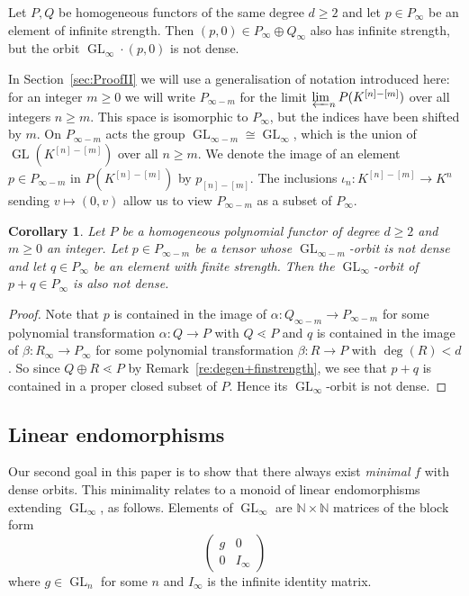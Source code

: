 \documentclass{amsart}
\theoremstyle{plain}
\newtheorem{cor}[thm]{Corollary}
\theoremstyle{definition}
\newcommand{\NN}{\mathbb{N}}
\DeclareMathOperator{\GL}{GL}
\begin{document}
\begin{ex}
Let $P,Q$ be homogeneous functors of the same degree $d\geq2$ and let $p\in P_{\infty}$ be an element of infinite strength. Then $(p,0)\in P_{\infty}\oplus Q_{\infty}$ also has infinite strength, but the orbit $\GL_{\infty}\!\cdot(p,0)$ is not dense.
\end{ex}

\begin{re} \label{re:Shift}
In Section~\ref{sec:ProofII} we will use a generalisation of
notation introduced here:
for an integer $m\geq0$ we will write $P_{\infty-m}$ for the
limit $\varprojlim_n P(K^{[n]-[m]})$ over all integers $n \geq m$. This space is isomorphic to
$P_\infty$, but the indices have been shifted by $m$. On $P_{\infty -
m}$ acts the group $\GL_{\infty-m} \cong \GL_\infty$, which is the union
of $\GL(K^{[n]-[m]})$ over all $n \geq m$. We denote the image of an element $p\in P_{\infty-m}$ in $P(K^{[n]-[m]})$ by $p_{[n]-[m]}$. The inclusions $\iota_n\colon K^{[n]-[m]}\to K^n$ sending $v\mapsto (0,v)$ allow us to view $P_{\infty-m}$ as a subset of $P_{\infty}$.
\end{re}

\begin{cor}\label{cor:degen+finstrength}
Let $P$ be a homogeneous polynomial functor of degree $d\geq 2$ and $m\geq0$ an integer. Let $p\in P_{\infty-m}$ be a tensor whose $\GL_{\infty-m}$-orbit is not dense and let $q\in P_{\infty}$ be an element with finite strength. Then the $\GL_{\infty}$-orbit of $p+q\in P_{\infty}$ is also not dense.
\end{cor}
\begin{proof}
Note that $p$ is contained in the image of $\alpha\colon Q_{\infty-m} \to P_{\infty-m}$
for some polynomial transformation $\alpha\colon Q \to P$ with $Q\lessdot P$ \cite[Theorem 4.2.5]{B:thesis} and $q$ is contained in the image of $\beta\colon R_{\infty} \to P_{\infty}$ for some polynomial transformation $\beta\colon R \to P$ with $\deg(R)<d$. So since $Q\oplus R\lessdot P$ by Remark~\ref{re:degen+finstrength}, we see that $p+q$ is contained in a proper closed subset of $P$. Hence its $\GL_{\infty}$-orbit is not dense.
\end{proof}

\subsection{Linear endomorphisms}\label{ss:linendo}

Our second goal in this paper is to show that there always exist {\em
minimal} $f$ with dense orbits. This minimality relates to a monoid of
linear endomorphisms extending $\GL_\infty$, as follows.
Elements of $\GL_\infty$ are $\NN\times\NN$ matrices of the block form
\[
\begin{pmatrix} g & 0 \\ 0 & I_{\infty} \end{pmatrix}
\]
where $g \in \GL_n$ for some $n$ and $I_{\infty}$ is the infinite identity
matrix.
\end{document}
